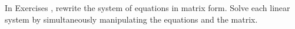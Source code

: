 {In Exercises}
{, rewrite the system of equations in matrix form. Solve each linear system by simultaneously manipulating the equations and the matrix.}
